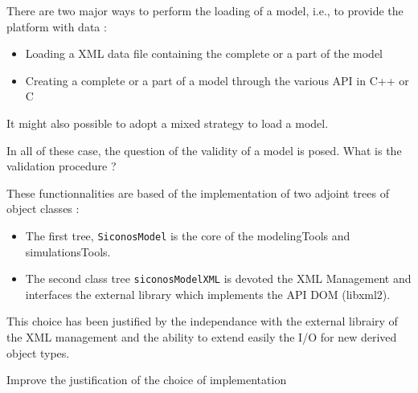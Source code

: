 
There are two major ways  to perform the loading of a model, i.e., to provide  the platform with data :
\begin{itemize}
\item Loading a XML data file containing the complete or a part of the model
\item Creating a complete or a part of a model through the various API in C++ or C
\end{itemize}
It might also possible to adopt a mixed strategy to load a model. 


\begin{ndr}
  In all of these case, the question of the validity of a model is  posed. 
What is the validation procedure ?
\end{ndr}

These functionnalities are based of the implementation of two adjoint trees of object classes :
\begin{itemize}
\item The first tree, \texttt{SiconosModel}  is the core of the modelingTools and simulationsTools.
\item The second class tree \texttt{siconosModelXML} is devoted the XML Management and interfaces the external  library which implements the API DOM (libxml2).
\end{itemize}
This choice has been justified by the independance with  the external librairy of the XML management and the ability to extend easily the I/O for new derived object types.

\begin{ndr}
  Improve the justification of the choice of implementation 
\end{ndr}

